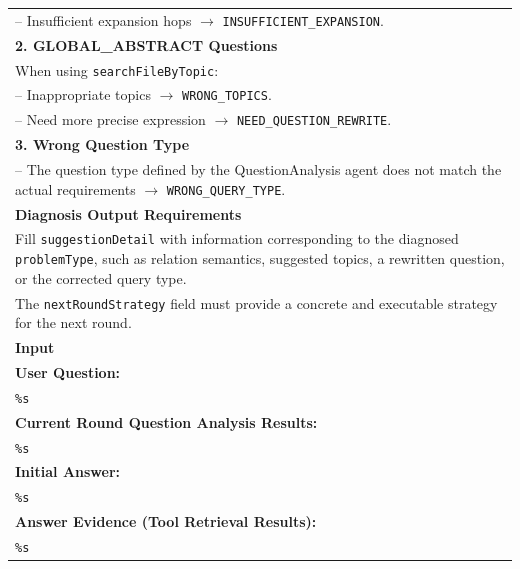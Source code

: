 {\begin{longtable}{@{}p{}@{}}
-- Insufficient expansion hops
$\rightarrow$ \texttt{INSUFFICIENT\_EXPANSION}.
\\


\textbf{2. GLOBAL\_ABSTRACT Questions}
\\

When using \texttt{searchFileByTopic}:
\\

-- Inappropriate topics
$\rightarrow$ \texttt{WRONG\_TOPICS}.
\\

-- Need more precise expression
$\rightarrow$ \texttt{NEED\_QUESTION\_REWRITE}.
\\


\textbf{3. Wrong Question Type}
\\

-- The question type defined by the QuestionAnalysis agent does not match the actual requirements
$\rightarrow$ \texttt{WRONG\_QUERY\_TYPE}.
\\


\textbf{Diagnosis Output Requirements}
\\

Fill \texttt{suggestionDetail} with information corresponding to the diagnosed
\texttt{problemType}, such as relation semantics, suggested topics, a rewritten
question, or the corrected query type.
\\

The \texttt{nextRoundStrategy} field must provide a concrete and executable
strategy for the next round.
\\


\textbf{Input}
\\


\textbf{User Question:}
\\

\texttt{\%s}
\\


\textbf{Current Round Question Analysis Results:}
\\

\texttt{\%s}
\\


\textbf{Initial Answer:}
\\

\texttt{\%s}
\\


\textbf{Answer Evidence (Tool Retrieval Results):}
\\

\texttt{\%s}
\\



\end{longtable}}
